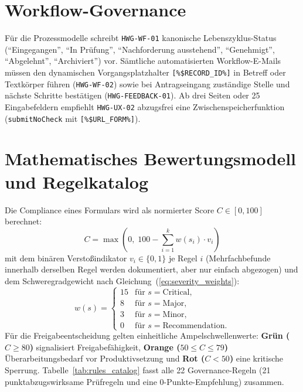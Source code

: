 \section{Workflow-Governance}
\label{sec:workflow_governance}

Für die Prozessmodelle schreibt \texttt{HWG-WF-01} kanonische Lebenszyklus-Status (\enquote{Eingegangen}, \enquote{In Prüfung}, \enquote{Nachforderung ausstehend}, \enquote{Genehmigt}, \enquote{Abgelehnt}, \enquote{Archiviert}) vor. Sämtliche automatisierten Workflow-E-Mails müssen den dynamischen Vorgangsplatzhalter \texttt{[\%\$RECORD\_ID\%]} in Betreff oder Textkörper führen (\texttt{HWG-WF-02}) sowie bei Antragseingang zuständige Stelle und nächste Schritte bestätigen (\texttt{HWG-\allowbreak FEEDBACK-01}). Ab drei Seiten oder 25 Eingabefeldern empfiehlt \texttt{HWG-UX-02} abzugsfrei eine Zwischenspeicherfunktion (\texttt{submitNoCheck} mit \texttt{[\%\$URL\_FORM\%]}).

\section{Mathematisches Bewertungsmodell und Regelkatalog}
\label{sec:formalisiertes_scoring}
\label{sec:scoring_modell}

Die Compliance eines Formulars wird als normierter Score $C \in [0, 100]$ berechnet:
\begin{equation}
    C = \max\left(0, \; 100 - \sum_{i=1}^{k} w(s_i) \cdot v_i\right)
    \label{eq:compliance_score}
\end{equation}
mit dem binären Verstoßindikator $v_i \in \{0, 1\}$ je Regel $i$ (Mehrfachbefunde innerhalb derselben Regel werden dokumentiert, aber nur einfach abgezogen) und dem Schweregradgewicht nach Gleichung~(\ref{eq:severity_weights}):
\begin{equation}
    w(s) = \begin{cases}
        15 & \text{für } s = \text{Critical}, \\
        8  & \text{für } s = \text{Major}, \\
        3  & \text{für } s = \text{Minor}, \\
        0  & \text{für } s = \text{Recommendation}.
    \end{cases}
    \label{eq:severity_weights}
\end{equation}
Für die Freigabeentscheidung gelten einheitliche Ampelschwellenwerte: \textbf{Grün ($C \ge 80$)} signalisiert Freigabefähigkeit, \textbf{Orange ($50 \le C \le 79$)} Überarbeitungsbedarf vor Produktivsetzung und \textbf{Rot ($C < 50$)} eine kritische Sperrung. Tabelle~\ref{tab:rules_catalog} fasst alle 22 Governance-Regeln (21 punktabzugswirksame Prüfregeln und eine 0-Punkte-Empfehlung) zusammen.

